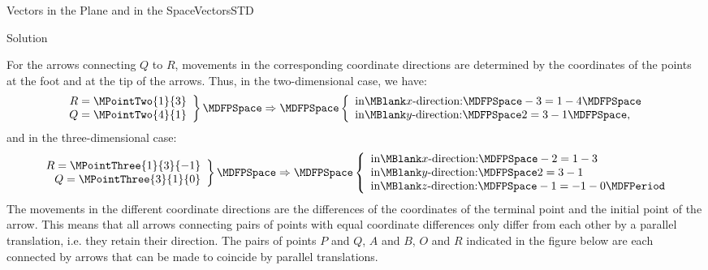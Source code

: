 \begin{MXContent}{Vectors in the Plane and in the Space}{Vectors}{STD}
\begin{MExercise}
\begin{MHint}{Solution}
\end{MHint}
\end{MExercise}

For the arrows connecting $Q$ to $R$, movements in the corresponding coordinate directions 
are determined by the coordinates of the points at the foot and at the tip of the arrows. 
Thus, in the two-dimensional case, we have:
\[
 \left.\begin{array}{r}R=\MPointTwo{1}{3} \\ Q=\MPointTwo{4}{1}\end{array}\right\}\MDFPSpace\Rightarrow\MDFPSpace\left\{\begin{array}{l}\textrm{in}\MBlank x\textrm{-direction:}\MDFPSpace-3=1-4 \MDFPSpace\\ \textrm{in}\MBlank y\textrm{-direction:}\MDFPSpace2=3-1 \MDFPSpace ,\end{array}\right.
\]
and in the three-dimensional case:
\[
 \left.\begin{array}{r}R=\MPointThree{1}{3}{-1} \\ Q=\MPointThree{3}{1}{0}\end{array}\right\}\MDFPSpace\Rightarrow\MDFPSpace\left\{\begin{array}{l}\textrm{in}\MBlank x\textrm{-direction:}\MDFPSpace-2=1-3 \\ \textrm{in}\MBlank y\textrm{-direction:}\MDFPSpace2=3-1 \\ \textrm{in}\MBlank z\textrm{-direction:}\MDFPSpace-1=-1-0\MDFPeriod\end{array}\right.
\]
The movements in the different coordinate directions are the differences of the coordinates 
of the terminal point and the initial point of the arrow. This means that all arrows connecting 
pairs of points with equal coordinate differences only differ from each other by a parallel translation, i.e. 
they retain their direction. The pairs of points $P$ and $Q$, $A$ and $B$, $O$ and $R$ indicated in 
the figure below are each connected by arrows that can be made to coincide by parallel translations.
\begin{center}
\end{center}
\end{MXContent}
